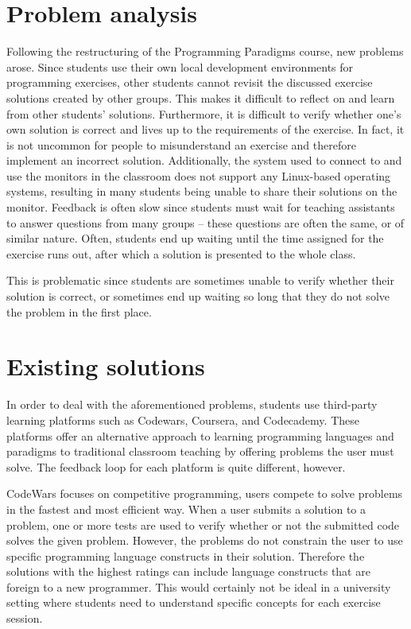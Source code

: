 \section{Problem analysis}
Following the restructuring of the Programming Paradigms course, new problems arose.
Since students use their own local development environments for programming exercises, other students cannot revisit the discussed exercise solutions created by other groups.
This makes it difficult to reflect on and learn from other students' solutions.
Furthermore, it is difficult to verify whether one's own solution is correct and lives up to the requirements of the exercise.
In fact, it is not uncommon for people to misunderstand an exercise and therefore implement an incorrect solution.
Additionally, the system used to connect to and use the monitors in the classroom does not support any Linux-based operating systems, resulting in many students being unable to share their solutions on the monitor.
Feedback is often slow since students must wait for teaching assistants to answer questions from many groups -- these questions are often the same, or of similar nature.
Often, students end up waiting until the time assigned for the exercise runs out, after which a solution is presented to the whole class.

This is problematic since students are sometimes unable to verify whether their solution is correct, or sometimes end up waiting so long that they do not solve the problem in the first place.

\section{Existing solutions}
In order to deal with the aforementioned problems, students use third-party learning platforms such as Codewars\cite{Codewars}, Coursera\cite{Coursera}, and Codecademy\cite{Codecademy}.
These platforms offer an alternative approach to learning programming languages and paradigms to traditional classroom teaching by offering problems the user must solve.
The feedback loop for each platform is quite different, however.


CodeWars focuses on competitive programming, users compete to solve problems in the fastest and most efficient way.
When a user submits a solution to a problem, one or more tests are used to verify whether or not the submitted code solves the given problem. 
However, the problems do not constrain the user to use specific programming language constructs in their solution.
Therefore the solutions with the highest ratings can include language constructs that are foreign to a new programmer. 
This would certainly not be ideal in a university setting where students need to understand specific concepts for each exercise session.


